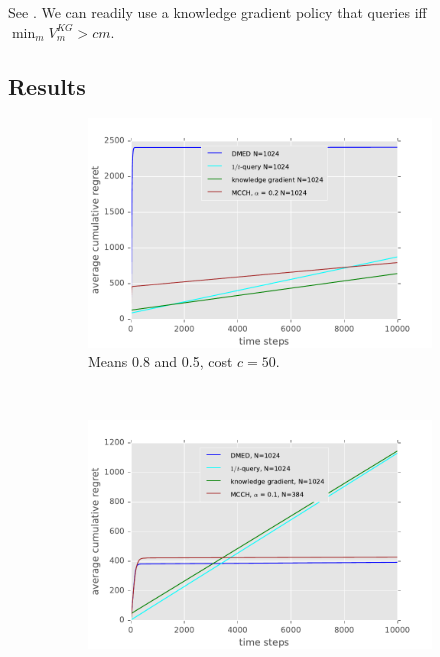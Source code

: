 \documentclass[a4paper]{article}
\begin{document}
See \citet[Sec.~5.2]{PowellRyzhov12}.
We can readily use a knowledge gradient policy that queries iff
$\min_m V^{KG}_m > cm$.



\subsection{Results}

\begin{figure}[t]
\centering
\begin{subfigure}[b]{0.48\textwidth}
\centering
\includegraphics[width=\textwidth]{regret50.pdf}
\caption{Means 0.8 and 0.5, cost $c = 50$.}
\label{fig:regret50}
\end{subfigure}%
~
\begin{subfigure}[b]{0.48\textwidth}
\centering
\includegraphics[width=\textwidth]{regret2.pdf}

\end{subfigure}
\end{figure}
\end{document}
